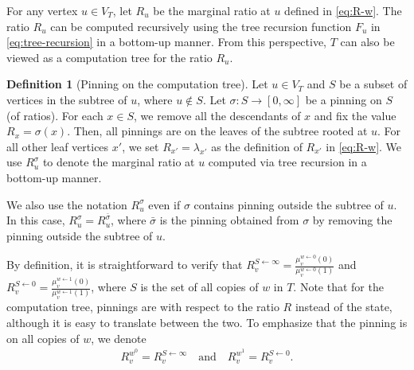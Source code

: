 \documentclass[11pt]{amsart}
\theoremstyle{definition}
\newtheorem{definition}[theorem]{Definition}
\theoremstyle{remark}
\begin{document}
For any vertex $u \in V_T$, let $R_u$ be the marginal ratio at $u$ defined in \eqref{eq:R-w}. The ratio $R_u$ can be computed recursively using the tree recursion function $F_u$ in \eqref{eq:tree-recursion} in a bottom-up manner. From this perspective, $T$ can also be viewed as a computation tree for the ratio $R_u$.

\begin{definition} [Pinning on the computation tree]\label{def:pinning-on-computation-tree}
  Let $u \in V_T$ and $S$ be a subset of vertices in the subtree of $u$, where $u \notin S$. Let $\sigma: S \to [0,\infty]$ be a pinning on $S$ (of ratios). For each $x \in S$, we remove all the descendants of $x$ and fix the value $R_x = \sigma(x)$. Then, all pinnings are on the leaves of the subtree rooted at $u$. For all other leaf vertices $x'$, we set $R_{x'} = \lambda_{x'}$ as the definition of $R_{x'}$ in \eqref{eq:R-w}. We use $R^\sigma_u$ to denote the marginal ratio at $u$ computed via tree recursion in a bottom-up manner.

We also use the notation $R^\sigma_u$ even if $\sigma$ contains pinning outside the subtree of $u$. In this case, $R^{\sigma}_u = R^{\bar{\sigma}}_u$, where $\bar{\sigma}$ is the pinning obtained from $\sigma$ by removing the pinning outside the subtree of $u$.
\end{definition}

By definition, it is straightforward to verify that $R^{S \gets \infty}_v = \frac{\mu_v^{w \gets 0}(0)}{\mu_v^{w \gets 0}(1)}$ and $R^{S \gets 0}_v = \frac{\mu_v^{w \gets 1}(0)}{\mu_v^{w \gets 1}(1)}$, where $S$ is the set of all copies of $w$ in $T$.
Note that for the computation tree, pinnings are with respect to the ratio $R$ instead of the state, although it is easy to translate between the two.
To emphasize that the pinning is on all copies of $w$, we denote 
\begin{align*}
R_v^{w^0} = R_v^{S \gets \infty} \quad \text{and} \quad R_v^{w^1} = R_v^{S \gets 0}.
\end{align*}
\end{document}

